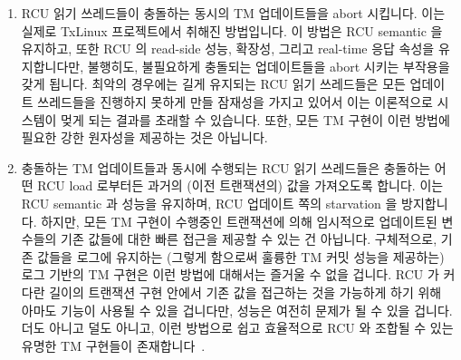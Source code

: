 \begin{enumerate}
\item	RCU 읽기 쓰레드들이 충돌하는 동시의 TM 업데이트들을 abort 시킵니다.
	이는 실제로 TxLinux 프로젝트에서 취해진 방법입니다.
	이 방법은 RCU semantic 을 유지하고, 또한 RCU 의 read-side 성능, 확장성,
	그리고 real-time 응답 속성을 유지합니다만, 불행히도, 불필요하게
	충돌되는 업데이트들을 abort 시키는 부작용을 갖게 됩니다.
	최악의 경우에는 길게 유지되는 RCU 읽기 쓰레드들은 모든 업데이트
	쓰레드들을 진행하지 못하게 만들 잠재성을 가지고 있어서 이는 이론적으로
	시스템이 멎게 되는 결과를 초래할 수 있습니다.
	또한, 모든 TM 구현이 이런 방법에 필요한 강한 원자성을 제공하는 것은
	아닙니다.

\item	충돌하는 TM 업데이트들과 동시에 수행되는 RCU 읽기 쓰레드들은 충돌하는
	어떤 RCU load 로부터든 과거의 (이전 트랜잭션의) 값을 가져오도록 합니다.
	이는 RCU semantic 과 성능을 유지하며, RCU 업데이트 쪽의 starvation 을
	방지합니다.
	하지만, 모든 TM 구현이 수행중인 트랜잭션에 의해 임시적으로 업데이트된
	변수들의 기존 값들에 대한 빠른 접근을 제공할 수 있는 건 아닙니다.
	구체적으로, 기존 값들을 로그에 유지하는 (그렇게 함으로써 훌륭한 TM 커밋
	성능을 제공하는) 로그 기반의 TM 구현은 이런 방법에 대해서는 즐거울 수
	없을 겁니다.
	RCU 가 커다란 길이의 트랜잭션 구현 안에서 기존 값을 접근하는 것을
	가능하게 하기 위해 아마도  기능이 사용될 수 있을
	겁니다만, 성능은 여전히 문제가 될 수 있을 겁니다.
	더도 아니고 덜도 아니고, 이런 방법으로 쉽고 효율적으로 RCU 와 조합될 수
	있는 유명한 TM 구현들이
	존재합니다~\cite{DonaldEPorter2007TRANSACT,PhilHoward2011RCUTMRBTree,PhilipWHoward2013RCUrbtree}.
\iffalse


\end{enumerate}
